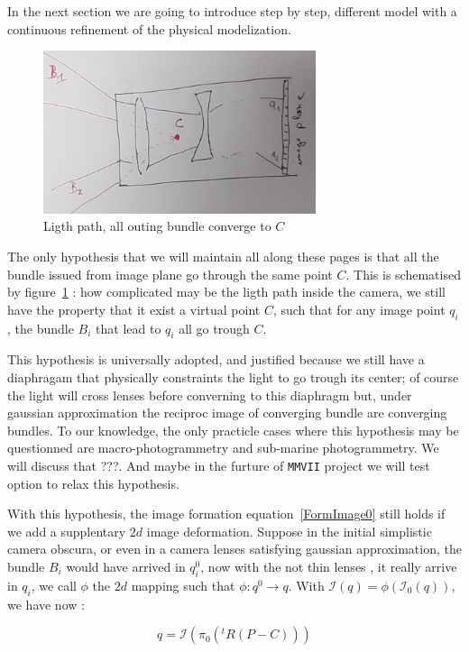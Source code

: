 In the next section we are going to introduce step by step, different model with a continuous
refinement of the physical modelization.  

\begin{figure}
\centering
	\includegraphics[width=8cm]{Methods/Images/CamPersp.jpg}
	\caption{Ligth path, all outing bundle converge to $C$}
	\label{fig:CamPerspScheme}
\end{figure}

The only hypothesis that we will maintain all along these pages is that all the bundle issued from image
plane go through the same point $C$. This is schematised by figure~\ref{fig:CamPerspScheme} :
how complicated may be the ligth path inside the camera, we still have the property that
it exist a virtual point $C$, such that for any image point $q_i$, the bundle $B_i$ that lead to $q_i$
all go trough $C$.

This hypothesis is universally adopted, and justified because we still have a diaphragam that physically constraints
the light to go trough its center; of course the light will cross lenses before converning to this diaphragm but, 
under gaussian approximation the reciproc image of converging bundle are converging bundles.
To our knowledge, the only practicle cases where this hypothesis may be questionned are macro-photogrammetry and
sub-marine photogrammetry. We will discuss that ???. And maybe in the furture of {\tt MMVII} project we will 
test option to relax this hypothesis.

With this hypothesis, the image formation equation~\ref{FormImage0} still holds if
we add a supplentary $2d$ image deformation. Suppose in the initial simplistic camera
obscura, or even in a camera lenses satisfying gaussian approximation, 
the bundle $B_i$ would have arrived in $q^0_i$, now with the not thin lenses ,
it really arrive in $q_i$, we call $\phi$ the $2d$ mapping such that $\phi : q^0 \rightarrow q$.
With $ \mathcal{I}(q) = \phi (\mathcal{I}_0(q))  $, we have now :


\begin{equation}
	q  =   \mathcal{I} (\pi_0 (^t R (P - C)))
\end{equation}

